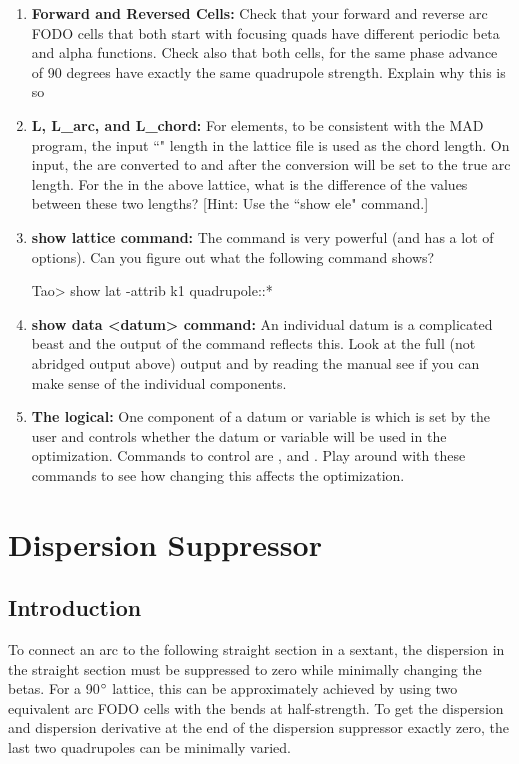 \documentclass{hitec}     %
\begin{document}
{\begin{enumerate}[leftmargin=*]
%
\item {\bf Forward and Reversed Cells:} Check that your forward and reverse arc FODO cells that both start with focusing quads have different periodic beta and alpha functions. Check also that both cells, for the same phase advance of 90 degrees have exactly the same quadrupole strength. Explain why this is so
%
\item {\bf L, L_arc, and L_chord:} For  elements, to be consistent with the MAD program, 
the input ``" length in the lattice file is used as the chord length. On input, the  
are converted to  and after the conversion  will be set to
the true arc length. For the  in the above lattice, what is the
difference of the values between these two lengths? 
[Hint: Use the ``show ele" command.]
%
\item {\bf show lattice command:} The  command is very powerful (and has a lot of options). 
Can you figure out what the following command shows?
\begin{code}
Tao> show lat -attrib k1 quadrupole::*
\end{code}
%
\item {\bf show data <datum> command:} An individual datum is a complicated beast and the output of the  command reflects this. Look at the full (not abridged output above) output and by reading the
\tao manual see if you can make sense of the individual components.
%
\item {\bf The  logical:} One component of a datum or variable is  which is set by
the user and controls whether the datum or variable will be used in the optimization. Commands to control 
are ,  and . Play around with these commands to see how changing this affects
the optimization.
\end{enumerate}

\newpage

\section{Dispersion Suppressor}
\label{s:dispersion}

\subsection{Introduction}
To connect an arc to the following straight section in a sextant, the dispersion 
in the straight section must be suppressed to zero while minimally changing the betas. 
For a 90$\degree$ lattice, this can be approximately achieved by using two equivalent arc FODO cells with the bends at half-strength.
To get the dispersion and dispersion derivative at the end of the dispersion suppressor exactly
zero, the last two quadrupoles can be minimally varied.

}
\end{document}
